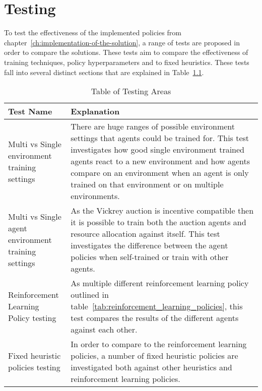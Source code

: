 \chapter{Testing}\label{ch:testing-of-the-implementation}
To test the effectiveness of the implemented policies from chapter~\ref{ch:implementation-of-the-solution}, a range of
tests are proposed in order to compare the solutions. These tests aim to compare the effectiveness of training
techniques, policy hyperparameters and to fixed heuristics. These tests fall into several distinct sections that are
explained in Table~\ref{tab:testing_areas}.

\begin{table}[h]
    \centering
    \begin{tabular}{|p{4cm}|p{11cm}|} \hline
        Test Name & Explanation \\ \hline
        Multi vs Single environment training settings & There are huge ranges of possible environment settings that
            agents could be trained for. This test investigates how good single environment trained agents react to
            a new environment and how agents compare on an environment when an agent is only trained on that
            environment or on multiple environments. \\ \hline
        Multi vs Single agent environment training settings & As the Vickrey auction is incentive compatible then it is
            possible to train both the auction agents and resource allocation against itself. This test investigates
            the difference between the agent policies when self-trained or train with other agents. \\ \hline
        Reinforcement Learning Policy testing & As multiple different reinforcement learning policy outlined in
            table~\ref{tab:reinforcement_learning_policies}, this test compares the results of the different agents
            against each other. \\ \hline
        Fixed heuristic policies testing & In order to compare to the reinforcement learning policies, a number of
            fixed heuristic policies are investigated both against other heuristics and reinforcement learning
            policies. \\ \hline
    \end{tabular}
    \caption{Table of Testing Areas}
    \label{tab:testing_areas}
\end{table}
